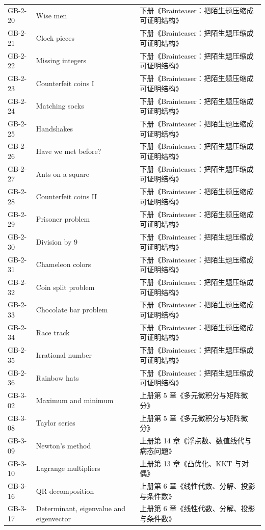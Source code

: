 \begin{longtable}{p{}p{}p{}}
GB-2-20 & Wise men & 下册《Brainteaser：把陌生题压缩成可证明结构》 \\
GB-2-21 & Clock pieces & 下册《Brainteaser：把陌生题压缩成可证明结构》 \\
GB-2-22 & Missing integers & 下册《Brainteaser：把陌生题压缩成可证明结构》 \\
GB-2-23 & Counterfeit coins I & 下册《Brainteaser：把陌生题压缩成可证明结构》 \\
GB-2-24 & Matching socks & 下册《Brainteaser：把陌生题压缩成可证明结构》 \\
GB-2-25 & Handshakes & 下册《Brainteaser：把陌生题压缩成可证明结构》 \\
GB-2-26 & Have we met before? & 下册《Brainteaser：把陌生题压缩成可证明结构》 \\
GB-2-27 & Ants on a square & 下册《Brainteaser：把陌生题压缩成可证明结构》 \\
GB-2-28 & Counterfeit coins II & 下册《Brainteaser：把陌生题压缩成可证明结构》 \\
GB-2-29 & Prisoner problem & 下册《Brainteaser：把陌生题压缩成可证明结构》 \\
GB-2-30 & Division by 9 & 下册《Brainteaser：把陌生题压缩成可证明结构》 \\
GB-2-31 & Chameleon colors & 下册《Brainteaser：把陌生题压缩成可证明结构》 \\
GB-2-32 & Coin split problem & 下册《Brainteaser：把陌生题压缩成可证明结构》 \\
GB-2-33 & Chocolate bar problem & 下册《Brainteaser：把陌生题压缩成可证明结构》 \\
GB-2-34 & Race track & 下册《Brainteaser：把陌生题压缩成可证明结构》 \\
GB-2-35 & Irrational number & 下册《Brainteaser：把陌生题压缩成可证明结构》 \\
GB-2-36 & Rainbow hats & 下册《Brainteaser：把陌生题压缩成可证明结构》 \\
GB-3-02 & Maximum and minimum & 上册第 5 章《多元微积分与矩阵微分》 \\
GB-3-08 & Taylor series & 上册第 5 章《多元微积分与矩阵微分》 \\
GB-3-09 & Newton's method & 上册第 14 章《浮点数、数值线代与病态问题》 \\
GB-3-10 & Lagrange multipliers & 上册第 13 章《凸优化、KKT 与对偶》 \\
GB-3-16 & QR decomposition & 上册第 6 章《线性代数、分解、投影与条件数》 \\
GB-3-17 & Determinant, eigenvalue and eigenvector & 上册第 6 章《线性代数、分解、投影与条件数》 \\

\end{longtable}
